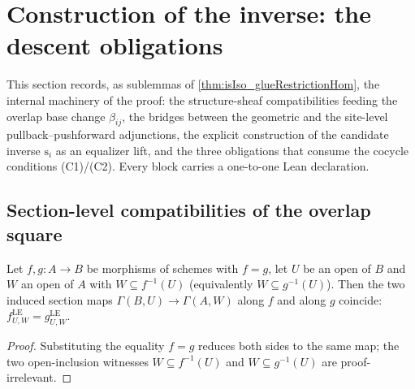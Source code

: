 \section{Construction of the inverse: the descent obligations}
\label{sec:gd_inverse}

This section records, as sublemmas of \cref{thm:isIso_glueRestrictionHom}, the
internal machinery of the proof: the structure-sheaf compatibilities feeding the
overlap base change \(\beta_{ij}\), the bridges between the geometric and the
site-level pullback--pushforward adjunctions, the explicit construction of the
candidate inverse \(\mathrm{s}_i\) as an equalizer lift, and the three obligations
that consume the cocycle conditions (C1)/(C2). Every block carries a one-to-one Lean
declaration.

\subsection{Section-level compatibilities of the overlap square}

\begin{lemma}
  \label{lem:gr_appLE_congr_mor}
  Let \(f, g : A \to B\) be morphisms of schemes with \(f = g\), let \(U\) be an open of
  \(B\) and \(W\) an open of \(A\) with \(W \subseteq f^{-1}(U)\) (equivalently
  \(W \subseteq g^{-1}(U)\)). Then the two induced section maps
  \(\Gamma(B, U) \to \Gamma(A, W)\) along \(f\) and along \(g\) coincide:
  \(f^{\mathrm{LE}}_{U,W} = g^{\mathrm{LE}}_{U,W}\).
\end{lemma}
\begin{proof}

\leanok
  Substituting the equality \(f = g\) reduces both sides to the same map; the two
  open-inclusion witnesses \(W \subseteq f^{-1}(U)\) and \(W \subseteq g^{-1}(U)\) are
  proof-irrelevant.
\end{proof}

